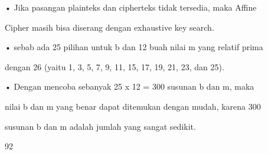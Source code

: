 \documentclass{article}
\begin{document}

• Jika pasangan plainteks dan cipherteks tidak tersedia, maka Affine 

Cipher masih bisa diserang dengan exhaustive key search. 

• sebab ada 25 pilihan untuk b dan 12 buah nilai m yang relatif prima 

dengan 26 (yaitu 1, 3, 5,  7, 9, 11, 15, 17, 19, 21, 23, dan 25). 

• Dengan mencoba sebanyak 25 x 12 = 300 susunan b dan m, maka 

nilai b dan m yang benar dapat ditemukan dengan mudah, karena 300 

susunan b dan m adalah jumlah yang sangat sedikit.

92
\end{document}

